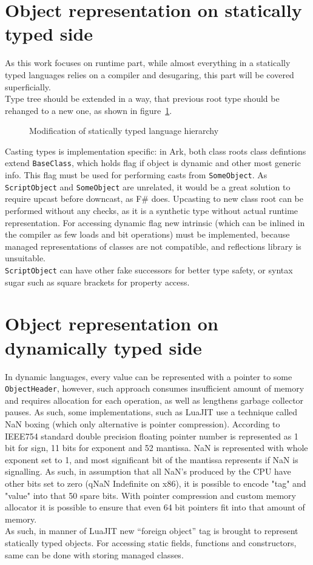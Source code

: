 \documentclass[times, %
               specification,annotation, %
               titlepage-extra-ru,specification-extra-ru,annotation-extra-ru, %
               languages={russian,english} %
              ]{itmo-student-thesis}
\begin{document}
\section{Object representation on statically typed side}
As this work focuses on runtime part, while almost everything in a statically typed languages relies on a compiler and desugaring, this part will be covered superficially.\\
Type tree should be extended in a way, that previous root type should be rehanged to a new one, as shown in figure~\ref{fig:statically-typed-tree}.
\begin{figure}[!h]
    \caption{Modification of statically typed language hierarchy}\label{fig:statically-typed-tree}
    \centering
    
\end{figure}
Casting types is implementation specific: in Ark, both class roots class defintions extend \texttt{BaseClass}, which holds flag if object is dynamic and other most generic info. This flag must be used for performing casts from \texttt{SomeObject}. As \texttt{ScriptObject} and \texttt{SomeObject} are unrelated, it would be a great solution to require upcast before downcast, as F\# does. Upcasting to new class root can be performed without any checks, as it is a synthetic type without actual runtime representation. For accessing dynamic flag new intrinsic (which can be inlined in the compiler as few loads and bit operations) must be implemented, because managed representations of classes are not compatible, and reflections library is unsuitable.\\
\texttt{ScriptObject} can have other fake successors for better type safety, or syntax sugar such as square brackets for property access.\\

\section{Object representation on dynamically typed side}
In dynamic languages, every value can be represented with a pointer to some \texttt{ObjectHeader}, however, such approach consumes insufficient amount of memory and requires allocation for each operation, as well as lengthens garbage collector pauses. As such, some implementations, such as LuaJIT use a technique called NaN boxing (which only alternative is pointer compression). According to IEEE754 standard double precision floating pointer number is represented as 1 bit for sign, 11 bits for exponent and 52 mantissa. NaN is represented with whole exponent set to 1, and most significant bit of the mantissa represents if NaN is signalling. As such, in assumption that all NaN's produced by the CPU have other bits set to zero (qNaN Indefinite on x86), it is possible to encode "tag" and "value" into that 50 spare bits. With pointer compression and custom memory allocator it is possible to ensure that even 64 bit pointers fit into that amount of memory.\\
As such, in manner of LuaJIT new ``foreign object'' tag is brought to represent statically typed objects. For accessing static fields, functions and constructors, same can be done with storing managed classes.
\end{document}
